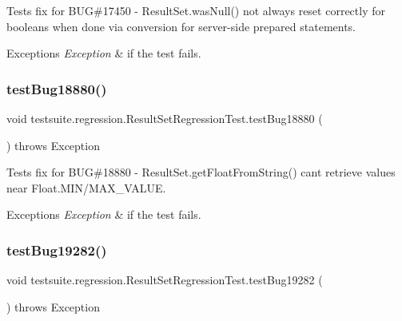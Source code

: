 Tests fix for B\+UG\#17450 -\/ Result\+Set.\+was\+Null() not always reset correctly for booleans when done via conversion for server-\/side prepared statements.


\begin{DoxyExceptions}{Exceptions}
{\em Exception} & if the test fails. \\
\hline
\end{DoxyExceptions}
\mbox{\label{classtestsuite_1_1regression_1_1_result_set_regression_test_a12e0f87612792e99392825bcd4cb8711}} 
\subsubsection{\texorpdfstring{test\+Bug18880()}{testBug18880()}}
{\footnotesize\ttfamily void testsuite.\+regression.\+Result\+Set\+Regression\+Test.\+test\+Bug18880 (\begin{DoxyParamCaption}{ }\end{DoxyParamCaption}) throws Exception}

Tests fix for B\+UG\#18880 -\/ Result\+Set.\+get\+Float\+From\+String() can\textquotesingle{}t retrieve values near Float.\+M\+IN/\+M\+A\+X\+\_\+\+V\+A\+L\+UE.


\begin{DoxyExceptions}{Exceptions}
{\em Exception} & if the test fails. \\
\hline
\end{DoxyExceptions}
\mbox{\label{classtestsuite_1_1regression_1_1_result_set_regression_test_ace41da4e4b41051800b1bb47347f5f5a}} 
\subsubsection{\texorpdfstring{test\+Bug19282()}{testBug19282()}}
{\footnotesize\ttfamily void testsuite.\+regression.\+Result\+Set\+Regression\+Test.\+test\+Bug19282 (\begin{DoxyParamCaption}{ }\end{DoxyParamCaption}) throws Exception}

